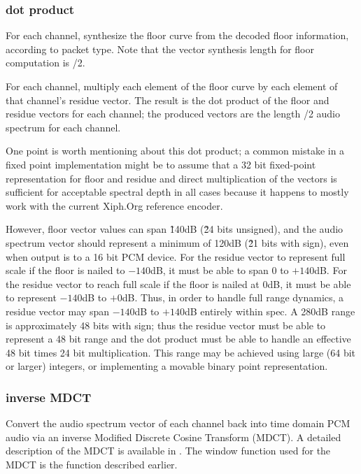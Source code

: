 \subsubsection{dot product}

For each channel, synthesize the floor curve from the decoded floor
information, according to packet type. Note that the vector synthesis
length for floor computation is \varname{[n]}/2.

For each channel, multiply each element of the floor curve by each
element of that channel's residue vector.  The result is the dot
product of the floor and residue vectors for each channel; the produced
vectors are the length \varname{[n]}/2 audio spectrum for each
channel.

One point is worth mentioning about this dot product; a common mistake
in a fixed point implementation might be to assume that a 32 bit
fixed-point representation for floor and residue and direct
multiplication of the vectors is sufficient for acceptable spectral
depth in all cases because it happens to mostly work with the current
Xiph.Org reference encoder.

However, floor vector values can span \~140dB (\~24 bits unsigned), and
the audio spectrum vector should represent a minimum of 120dB (\~21
bits with sign), even when output is to a 16 bit PCM device.  For the
residue vector to represent full scale if the floor is nailed to
$-140$dB, it must be able to span 0 to $+140$dB.  For the residue vector
to reach full scale if the floor is nailed at 0dB, it must be able to
represent $-140$dB to $+0$dB.  Thus, in order to handle full range
dynamics, a residue vector may span $-140$dB to $+140$dB entirely within
spec.  A 280dB range is approximately 48 bits with sign; thus the
residue vector must be able to represent a 48 bit range and the dot
product must be able to handle an effective 48 bit times 24 bit
multiplication.  This range may be achieved using large (64 bit or
larger) integers, or implementing a movable binary point
representation.



\subsubsection{inverse MDCT}

Convert the audio spectrum vector of each channel back into time
domain PCM audio via an inverse Modified Discrete Cosine Transform
(MDCT).  A detailed description of the MDCT is available in \cite{Sporer/Brandenburg/Edler}.  The window
function used for the MDCT is the function described earlier.



